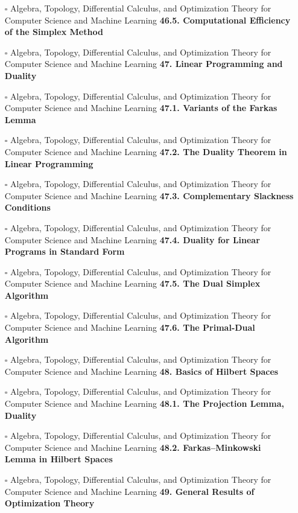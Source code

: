 \documentclass[a4, landscape, 12pt]{article}
\newcommand{\checkbox}{$\square$}%
\begin{document}
\begin{itemize}
{}
\item [\checkbox]  Algebra, Topology, Differential Calculus, and Optimization Theory for Computer Science and Machine Learning \textbf{ 46.5. Computational Efficiency of the Simplex Method
}
\item [\checkbox]  Algebra, Topology, Differential Calculus, and Optimization Theory for Computer Science and Machine Learning \textbf{ 47. Linear Programming and Duality
}
\item [\checkbox]  Algebra, Topology, Differential Calculus, and Optimization Theory for Computer Science and Machine Learning \textbf{ 47.1. Variants of the Farkas Lemma
}
\item [\checkbox]  Algebra, Topology, Differential Calculus, and Optimization Theory for Computer Science and Machine Learning \textbf{ 47.2. The Duality Theorem in Linear Programming
}
\item [\checkbox]  Algebra, Topology, Differential Calculus, and Optimization Theory for Computer Science and Machine Learning \textbf{ 47.3. Complementary Slackness Conditions
}
\item [\checkbox]  Algebra, Topology, Differential Calculus, and Optimization Theory for Computer Science and Machine Learning \textbf{ 47.4. Duality for Linear Programs in Standard Form
}
\item [\checkbox]  Algebra, Topology, Differential Calculus, and Optimization Theory for Computer Science and Machine Learning \textbf{ 47.5. The Dual Simplex Algorithm
}
\item [\checkbox]  Algebra, Topology, Differential Calculus, and Optimization Theory for Computer Science and Machine Learning \textbf{ 47.6. The Primal-Dual Algorithm
}
\item [\checkbox]  Algebra, Topology, Differential Calculus, and Optimization Theory for Computer Science and Machine Learning \textbf{ 48. Basics of Hilbert Spaces
}
\item [\checkbox]  Algebra, Topology, Differential Calculus, and Optimization Theory for Computer Science and Machine Learning \textbf{ 48.1. The Projection Lemma, Duality
}
\item [\checkbox]  Algebra, Topology, Differential Calculus, and Optimization Theory for Computer Science and Machine Learning \textbf{ 48.2. Farkas–Minkowski Lemma in Hilbert Spaces
}
\item [\checkbox]  Algebra, Topology, Differential Calculus, and Optimization Theory for Computer Science and Machine Learning \textbf{ 49. General Results of Optimization Theory
}
\end{itemize}
\end{document}
